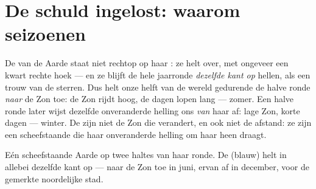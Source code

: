 \section{De schuld ingelost: waarom seizoenen}

\begin{proposition}\label{prop:g6:sun-earth-moon:tilt}
De  van de Aarde staat niet rechtop op haar : ze helt
over, met ongeveer een kwart rechte hoek --- en ze blijft de hele
jaarronde \emph{dezelfde kant op} hellen, als een trouw  van de
sterren. Dus helt onze helft van de wereld gedurende de halve ronde
\emph{naar} de Zon toe: de Zon rijdt hoog, de dagen lopen lang ---
zomer. Een halve ronde later wijst dezelfde onveranderde helling ons
\emph{van} haar af: lage Zon, korte dagen --- winter. De
 zijn niet de Zon die verandert, en ook niet de afstand: ze
zijn een scheefstaande  die haar onveranderde helling om haar
 heen draagt.
\end{proposition}

\begin{omfigure}

{\small Eén scheefstaande Aarde op twee haltes van haar ronde. De
 (blauw) helt in allebei dezelfde kant op --- naar de Zon toe in
juni, ervan af in december, voor de gemerkte noordelijke stad.}
\end{omfigure}

